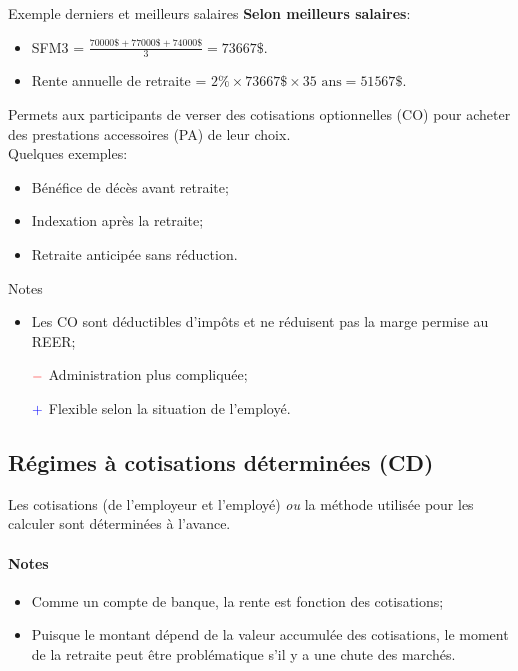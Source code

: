 \documentclass[10pt, french]{article}
\begin{document}
\begin{multicols*}{3}
\begin{conceptgen}{Exemple derniers et meilleurs salaires}
\textbf{Selon meilleurs salaires}:
\begin{itemize}
	\item	SFM3 = $\frac{70 000\$ + 77 000\$ + 74 000\$}{3} = 73 667\$$.
	\item	Rente annuelle de retraite = $2\% \times 73 667\$ \times 35 \text{ ans} = 51 567\$$.
\end{itemize}
\end{conceptgen}

\begin{definitionNOHFILL}
Permets aux participants de verser des cotisations optionnelles (CO) pour acheter des prestations accessoires (PA) de leur choix.\\

Quelques exemples:
\begin{itemize}[leftmargin = *]
	\item	Bénéfice de décès avant retraite;
	\item	Indexation après la retraite;
	\item	Retraite anticipée sans réduction.
\end{itemize}

Notes
\begin{itemize}[leftmargin = *]
	\item	Les CO sont déductibles d'impôts et ne réduisent pas la marge permise au REER;
	\item[$\color{red}-$]	Administration plus compliquée;
	\item[$\color{blue}+$]	Flexible selon la situation de l'employé.
\end{itemize}
\end{definitionNOHFILL}

\columnbreak

\subsection{Régimes à cotisations déterminées (CD)}

\begin{definitionNOHFILL}[Description]
Les cotisations (de l'employeur et l'employé) \textit{ou} la méthode utilisée pour les calculer sont déterminées à l'avance.

\paragraph{Notes}
\begin{itemize}[leftmargin = *]
	\item	Comme un compte de banque, la rente est fonction des cotisations;
	\item	Puisque le montant dépend de la valeur accumulée des cotisations, le moment de la retraite peut être problématique s'il y a une chute des marchés.
\end{itemize}
\end{definitionNOHFILL}



\end{multicols*}
\end{document}
